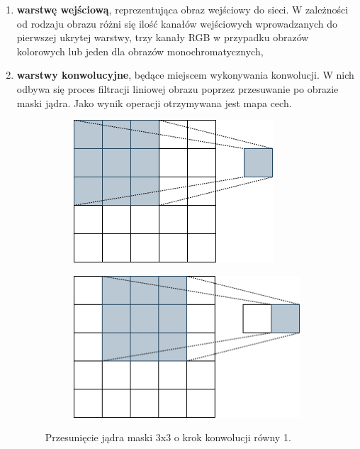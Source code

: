 \begin{enumerate}
    \item \textbf{warstwę wejściową}, reprezentująca obraz wejściowy do sieci. W zależności od rodzaju obrazu różni się ilość kanałów wejściowych wprowadzanych do pierwszej ukrytej warstwy, trzy kanały RGB w przypadku obrazów kolorowych lub jeden dla obrazów monochromatycznych,
    
    \item \textbf{warstwy konwolucyjne}, będące miejscem wykonywania konwolucji. W nich odbywa się  proces filtracji liniowej obrazu poprzez przesuwanie po obrazie maski jądra. Jako wynik operacji otrzymywana jest mapa cech.
        \begin{figure}[H]
            \begin{subfigure}{.5\textwidth}
              \centering
              \includegraphics[width=0.7\linewidth]{Obrazy/Rozdzial02/konwolucyja1.png}
              \label{fig:konwolucja1}
            \end{subfigure}%
            \begin{subfigure}{.5\textwidth}
              \centering
              \includegraphics[width=0.8\linewidth]{Obrazy/Rozdzial02/konwolucyja2.png}
              \label{fig:konwolucja2}
            \end{subfigure}
            \caption{Przesunięcie jądra maski 3x3 o krok konwolucji równy 1.}
            \label{fig:test}
        \end{figure}
        

\end{enumerate}
